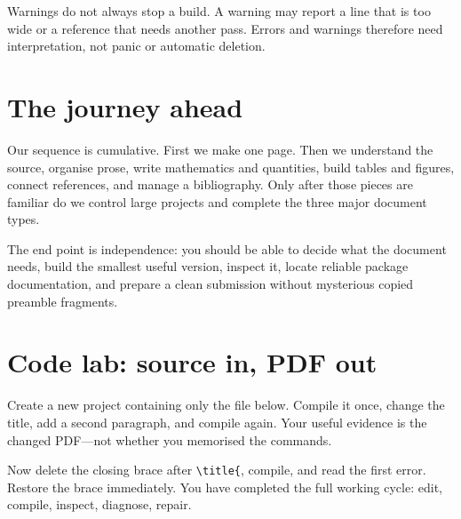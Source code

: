Warnings do not always stop a build. A warning may report a line that is too
wide or a reference that needs another pass. Errors and warnings therefore
need interpretation, not panic or automatic deletion.

\section{The journey ahead}

Our sequence is cumulative. First we make one page. Then we understand the
source, organise prose, write mathematics and quantities, build tables and
figures, connect references, and manage a bibliography. Only after those
pieces are familiar do we control large projects and complete the three major
document types.

The end point is independence: you should be able to decide what the document
needs, build the smallest useful version, inspect it, locate reliable package
documentation, and prepare a clean submission without mysterious copied
preamble fragments.

\section{Code lab: source in, PDF out}

\begin{codelab}
Create a new project containing only the file below. Compile it once, change
the title, add a second paragraph, and compile again. Your useful evidence is
the changed PDF---not whether you memorised the commands.
\end{codelab}


Now delete the closing brace after \verb|\title{|, compile, and read the first
error. Restore the brace immediately. You have completed the full working
cycle: edit, compile, inspect, diagnose, repair.

